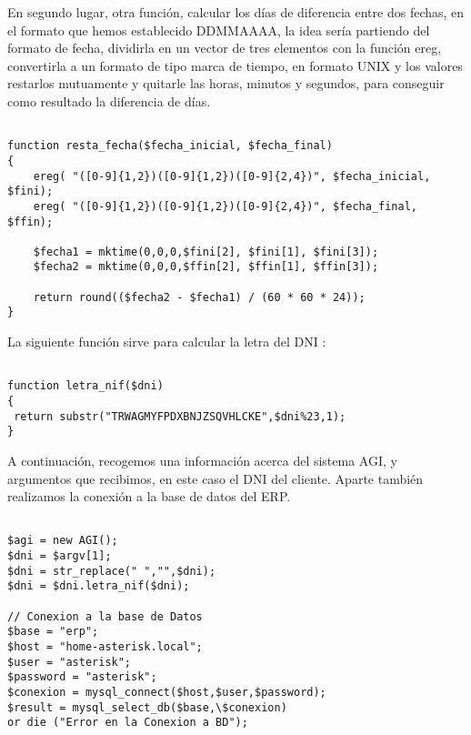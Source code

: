 En segundo lugar, otra función, calcular los días de diferencia entre dos fechas, en el formato que hemos establecido DDMMAAAA, la idea sería partiendo del formato de fecha, dividirla en un vector de tres elementos con la función ereg, convertirla a un formato de tipo marca de tiempo, en formato UNIX y los valores restarlos mutuamente y quitarle las horas, minutos y segundos, para conseguir como resultado la diferencia de días.

\begin{lstlisting}[style=php,title={/var/lib/asterisk/agi-bin/fingarantia.php}]

function resta_fecha($fecha_inicial, $fecha_final)
{
    ereg( "([0-9]{1,2})([0-9]{1,2})([0-9]{2,4})", $fecha_inicial, $fini);
    ereg( "([0-9]{1,2})([0-9]{1,2})([0-9]{2,4})", $fecha_final, $ffin);

    $fecha1 = mktime(0,0,0,$fini[2], $fini[1], $fini[3]);
    $fecha2 = mktime(0,0,0,$ffin[2], $ffin[1], $ffin[3]);

    return round(($fecha2 - $fecha1) / (60 * 60 * 24));
}

\end{lstlisting}

La siguiente función sirve para calcular la letra del DNI \cite{website:algoritmodni}:

\begin{lstlisting}[style=php,title={/var/lib/asterisk/agi-bin/fingarantia.php}]

function letra_nif($dni)
{
 return substr("TRWAGMYFPDXBNJZSQVHLCKE",$dni%23,1);
}

\end{lstlisting}

A continuación, recogemos una información acerca del sistema AGI, y argumentos que recibimos, en este caso el DNI del cliente. Aparte también realizamos la conexión a la base de datos del ERP.

\begin{lstlisting}[style=php,title={/var/lib/asterisk/agi-bin/fingarantia.php}]

$agi = new AGI();
$dni = $argv[1];
$dni = str_replace(" ","",$dni);
$dni = $dni.letra_nif($dni);

// Conexion a la base de Datos
$base = "erp";
$host = "home-asterisk.local";
$user = "asterisk";
$password = "asterisk";
$conexion = mysql_connect($host,$user,$password);
$result = mysql_select_db($base,\$conexion) 
or die ("Error en la Conexion a BD");

\end{lstlisting}

